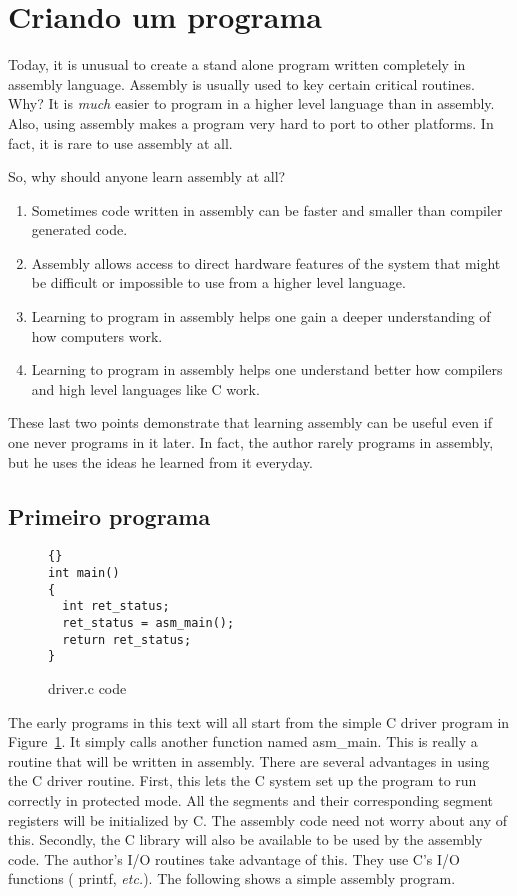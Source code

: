 \section{Criando um programa}

Today, it is unusual to create a stand alone program written
completely in assembly language. Assembly is usually used to key certain
critical routines. Why? It is \emph{much} easier to program in a higher level
language than in assembly. Also, using assembly makes a program very hard to
port to other platforms. In fact, it is rare to use assembly at all.

So, why should anyone learn assembly at all?
\begin{enumerate}
\item Sometimes code written in assembly can be faster and smaller than
      compiler generated code.
\item Assembly allows access to direct hardware features of the system that
      might be difficult or impossible to use from a higher level language.
\item Learning to program in assembly helps one gain a deeper understanding of
      how computers work.
\item Learning to program in assembly helps one understand better how compilers
      and high level languages like C work.
\end{enumerate}
These last two points demonstrate that learning assembly can be useful even if
one never programs in it later. In fact, the author rarely programs in
assembly, but he uses the ideas he learned from it everyday.

\subsection{Primeiro programa}

\begin{figure}[t]
\begin{lstlisting}[frame=tlrb]{}
int main()
{
  int ret_status;
  ret_status = asm_main();
  return ret_status;
}
\end{lstlisting}
\caption{{\code driver.c} code\label{fig:driverProg} }
\end{figure}

The early programs in this text will all start from the simple C
driver program in Figure~\ref{fig:driverProg}. It simply calls
another function named {\code asm\_main}. This is really a routine
that will be written in assembly. There are several advantages in
using the C driver routine. First, this lets the C system set up the
program to run correctly in protected mode. All the segments and their
corresponding segment registers will be initialized by C. The assembly
code need not worry about any of this. Secondly, the C library will
also be available to be used by the assembly code. The author's I/O
routines take advantage of this. They use C's I/O functions ({\code
printf}, {\em etc.}).  The following shows a simple assembly program.

